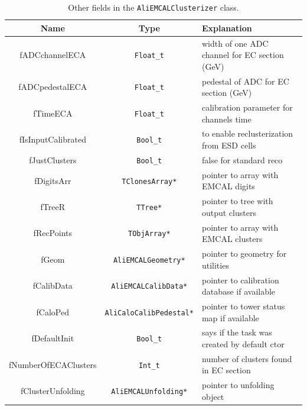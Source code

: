 %
\begin{table}[!h]
\begin{center}
  \begin{tabular}{| c | c | l |}
  \hline
  Name & Type & Explanation \\ 
  \hline
    fADCchannelECA     &  \texttt{Float\_t}         &  width of one ADC channel for EC section (GeV)\\
    fADCpedestalECA    &  \texttt{Float\_t}         &  pedestal of ADC for EC section (GeV)\\
    fTimeECA           &  \texttt{Float\_t}         &  calibration parameter for channels time\\
    fIsInputCalibrated &  \texttt{Bool\_t}          &  to enable reclusterization from ESD cells\\
    fJustClusters      &  \texttt{Bool\_t}          &  false for standard reco                  \\
    fDigitsArr    & \texttt{TClonesArray*}          &  pointer to array with EMCAL digits       \\
    fTreeR        & \texttt{TTree*}                 &  pointer to tree with output clusters                                         \\
    fRecPoints    & \texttt{TObjArray*}             &  pointer to array with EMCAL clusters                                         \\
    fGeom         & \texttt{AliEMCALGeometry*}      &  pointer to geometry for utilities                                            \\
    fCalibData    & \texttt{AliEMCALCalibData*}     &  pointer to calibration database if available                                  \\
    fCaloPed      & \texttt{AliCaloCalibPedestal*}  &  pointer to tower status map if available                                      \\
    fDefaultInit         & \texttt{Bool\_t}          &  says if the task was created by default ctor \\
    fNumberOfECAClusters & \texttt{Int\_t}           &  number of clusters found in EC section \\
    fClusterUnfolding & \texttt{AliEMCALUnfolding*} &  pointer to unfolding object \\
\hline
  \end{tabular}
\end{center}
\caption{Other fields in the \texttt{AliEMCALClusterizer} class.}
\label{tab:clusterizationfields}
\end{table}
